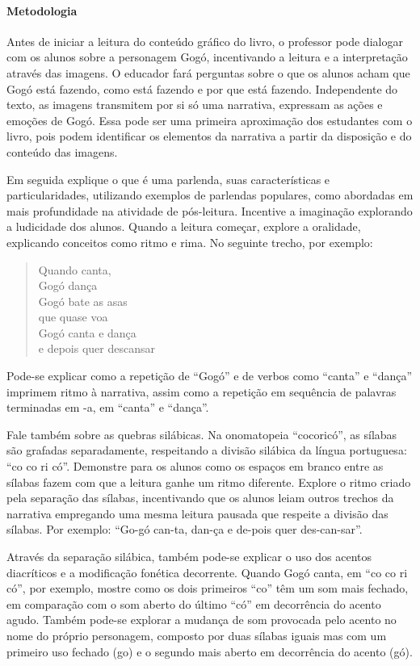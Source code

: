 \documentclass[11pt]{extarticle}
\begin{document}
\paragraph{Metodologia} Antes de iniciar a leitura do conteúdo gráfico do livro, o professor pode dialogar com os alunos sobre a personagem Gogó, incentivando a leitura e a interpretação  através das imagens. O educador fará perguntas sobre o que os alunos acham que Gogó está fazendo, como está fazendo e por que está fazendo. Independente do texto, as imagens transmitem por si só uma narrativa, expressam as ações e emoções de Gogó. Essa pode ser uma primeira aproximação dos estudantes com o livro, pois podem identificar os elementos da narrativa a partir da disposição e do conteúdo das imagens.

Em seguida explique o que é uma parlenda, suas características e particularidades, utilizando exemplos de parlendas populares, como abordadas em mais profundidade na atividade de pós-leitura. Incentive a imaginação explorando a ludicidade dos alunos.  Quando a leitura começar, explore a oralidade, explicando conceitos como ritmo e rima. No seguinte trecho, por exemplo:

\begin{verse}
Quando canta,\\
Gogó dança\\
Gogó bate as asas\\
que quase voa\\
Gogó canta e dança\\
e depois quer descansar
\end{verse}

Pode-se explicar como a repetição de ``Gogó'' e de verbos como ``canta'' e ``dança'' imprimem ritmo à narrativa, assim como a repetição em sequência de palavras terminadas em -a, em ``canta'' e ``dança''.

Fale também sobre as quebras silábicas. Na onomatopeia ``cocoricó'', as sílabas são grafadas separadamente, respeitando a divisão silábica da língua portuguesa: ``co co ri có''. Demonstre para os alunos como os espaços em branco entre as sílabas fazem com que a leitura ganhe um ritmo diferente. Explore o ritmo criado pela separação das sílabas, incentivando que os alunos leiam outros trechos da narrativa empregando uma mesma leitura pausada que respeite a divisão das sílabas. Por exemplo: ``Go-gó can-ta, dan-ça e de-pois quer des-can-sar''.

Através da separação silábica, também pode-se explicar o uso dos acentos diacríticos e a modificação fonética decorrente. Quando Gogó canta, em ``co co ri có'', por exemplo, mostre como os dois primeiros ``co'' têm um som mais fechado, em comparação com o som aberto do último ``có'' em decorrência do acento agudo. Também pode-se explorar a mudança de som provocada pelo acento no nome do próprio personagem, composto por duas sílabas iguais mas com um primeiro uso fechado (go) e o segundo mais aberto em decorrência do acento (gó).
\end{document}
